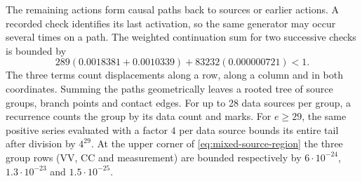 \documentclass[10pt,twocolumn]{article}
\theoremstyle{definition}
\begin{document}
The remaining actions form causal paths back to sources or earlier
actions. A recorded check identifies its last activation, so the same
generator may occur several times on a path. The weighted continuation
sum for two successive checks is bounded by
\[
 289(0.0018381+0.0010339)+83232(0.000000721)<1 .
\]
The three terms count displacements along a row, along a column and in
both coordinates. Summing the paths geometrically leaves a rooted tree
of source groups, branch points and contact edges. For up to 28 data
sources per group, a recurrence counts the group by its data count and
marks. For $e\ge29$, the same positive series evaluated with a factor
$4$ per data source bounds its entire tail after division by $4^{29}$.
At the upper corner of \eqref{eq:mixed-source-region} the three group
rows (VV, CC and measurement) are bounded respectively by
$6\cdot10^{-24}$, $1.3\cdot10^{-23}$ and $1.5\cdot10^{-25}$.
\end{document}
